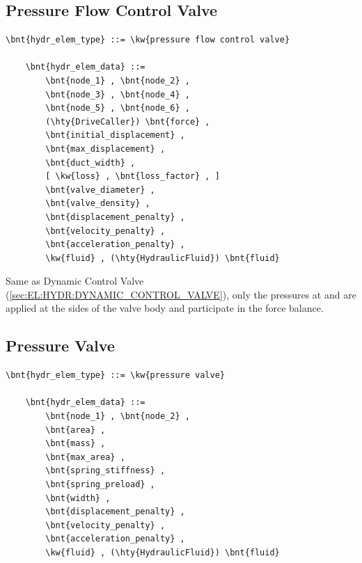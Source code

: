 \subsection{Pressure Flow Control Valve}
\label{sec:EL:HYDR:PRESSURE_FLOW_CONTROL_VALVE}
\begin{Verbatim}[commandchars=\\\{\}]
    \bnt{hydr_elem_type} ::= \kw{pressure flow control valve}

    \bnt{hydr_elem_data} ::=
        \bnt{node_1} , \bnt{node_2} ,
        \bnt{node_3} , \bnt{node_4} ,
        \bnt{node_5} , \bnt{node_6} ,
        (\hty{DriveCaller}) \bnt{force} ,
        \bnt{initial_displacement} ,
        \bnt{max_displacement} ,
        \bnt{duct_width} ,
        [ \kw{loss} , \bnt{loss_factor} , ]
        \bnt{valve_diameter} ,
        \bnt{valve_density} ,
        \bnt{displacement_penalty} ,
        \bnt{velocity_penalty} ,
        \bnt{acceleration_penalty} ,
        \kw{fluid} , (\hty{HydraulicFluid}) \bnt{fluid}
\end{Verbatim}
Same as Dynamic Control Valve (\ref{sec:EL:HYDR:DYNAMIC_CONTROL_VALVE}),
only the pressures at  and  are applied
at the sides of the valve body and participate in the force balance.



\subsection{Pressure Valve}
\label{sec:EL:HYDR:PRESSURE_VALVE}
\begin{Verbatim}[commandchars=\\\{\}]
    \bnt{hydr_elem_type} ::= \kw{pressure valve}

    \bnt{hydr_elem_data} ::=
        \bnt{node_1} , \bnt{node_2} ,
        \bnt{area} ,
        \bnt{mass} ,
        \bnt{max_area} ,
        \bnt{spring_stiffness} ,
        \bnt{spring_preload} ,
        \bnt{width} ,
        \bnt{displacement_penalty} ,
        \bnt{velocity_penalty} ,
        \bnt{acceleration_penalty} ,
        \kw{fluid} , (\hty{HydraulicFluid}) \bnt{fluid}
\end{Verbatim}

